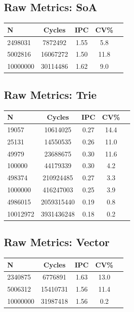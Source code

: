 \clearpage
\subsection*{Raw Metrics: SoA}
\begin{table}[H]
\centering
{}
\begin{tabular}{@{}lcccc@{}}
\toprule
\rowcolor{teal!20} N & Cycles & IPC & CV\% \\ \midrule
2498031 & 7872492 & 1.55 & 5.8 \\ 
5002816 & 16067272 & 1.50 & 11.8 \\ 
10000000 & 30114486 & 1.62 & 9.0 \\ 
\bottomrule
\end{tabular}
\end{table}

\subsection*{Raw Metrics: Trie}
\begin{table}[H]
\centering
{}
\begin{tabular}{@{}lcccc@{}}
\toprule
\rowcolor{teal!20} N & Cycles & IPC & CV\% \\ \midrule
19057 & 10614025 & 0.27 & 14.4 \\ 
25131 & 14550535 & 0.26 & 11.0 \\ 
49979 & 23688675 & 0.30 & 11.6 \\ 
100000 & 44179339 & 0.30 & 4.2 \\ 
498374 & 210924485 & 0.27 & 3.3 \\ 
1000000 & 416247003 & 0.25 & 3.9 \\ 
4986015 & 2059315440 & 0.19 & 0.8 \\ 
10012972 & 3931436248 & 0.18 & 0.2 \\ 
\bottomrule
\end{tabular}
\end{table}

\clearpage
\subsection*{Raw Metrics: Vector}
\begin{table}[H]
\centering
{}
\begin{tabular}{@{}lcccc@{}}
\toprule
\rowcolor{teal!20} N & Cycles & IPC & CV\% \\ \midrule
2340875 & 6776891 & 1.63 & 13.0 \\ 
5006312 & 15410731 & 1.56 & 11.4 \\ 
10000000 & 31987418 & 1.56 & 0.2 \\ 
\bottomrule
\end{tabular}
\end{table}

